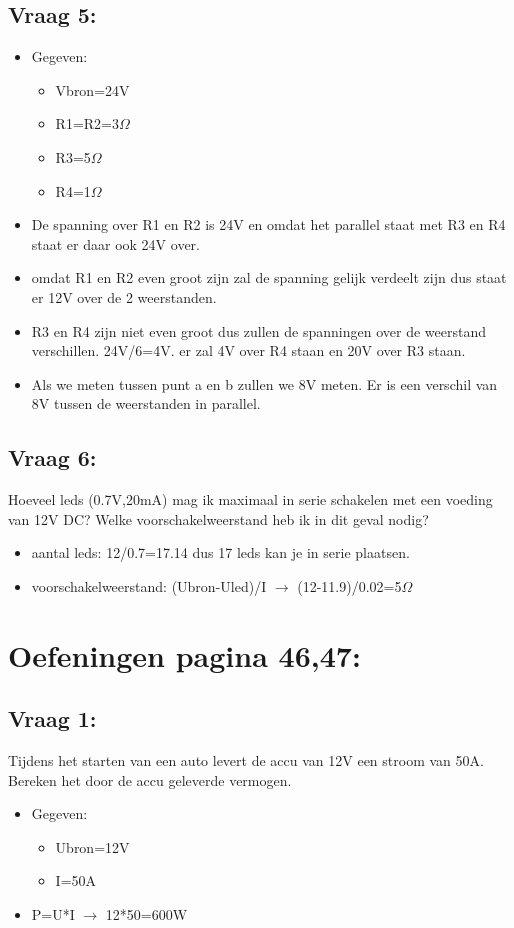\documentclass[12pt]{article}
\begin{document}
\subsection{Vraag 5:}
\begin{itemize}
    \item[] Gegeven:\begin{itemize}
        \item Vbron=24V
        \item R1=R2=3$\Omega$
        \item R3=5$\Omega$
        \item R4=1$\Omega$
    \end{itemize}
\end{itemize}
\begin{itemize}
    \item De spanning over R1 en R2 is 24V en omdat het parallel staat met R3 en R4 staat er daar ook 24V over.
    \item omdat R1 en R2 even groot zijn zal de spanning gelijk verdeelt zijn dus staat er 12V over de 2 weerstanden.
    \item R3 en R4 zijn niet even groot dus zullen de spanningen over de weerstand verschillen. 24V/6=4V. er zal 4V over R4 staan en 20V over R3 staan.
    \item Als we meten tussen punt a en b zullen we 8V meten. Er is een verschil van 8V tussen de weerstanden in parallel.
\end{itemize}
\subsection{Vraag 6:}
Hoeveel leds (0.7V,20mA) mag ik maximaal in serie schakelen met een voeding van 12V DC? Welke voorschakelweerstand heb ik in dit geval nodig?
\begin{itemize}
    \item aantal leds: 12/0.7=17.14 dus 17 leds kan je in serie plaatsen.
    \item voorschakelweerstand: (Ubron-Uled)/I $\rightarrow$ (12-11.9)/0.02=5$\Omega$
\end{itemize}
\section{Oefeningen pagina 46,47:}
\subsection{Vraag 1:}
Tijdens het starten van een auto levert de accu van 12V een stroom van 50A. Bereken het door de accu geleverde vermogen.
\begin{itemize}
    \item[] Gegeven:\begin{itemize}
        \item Ubron=12V
        \item I=50A
    \end{itemize}
\end{itemize}
\begin{itemize}
    \item P=U*I $\rightarrow$ 12*50=600W 
\end{itemize}
\end{document}
